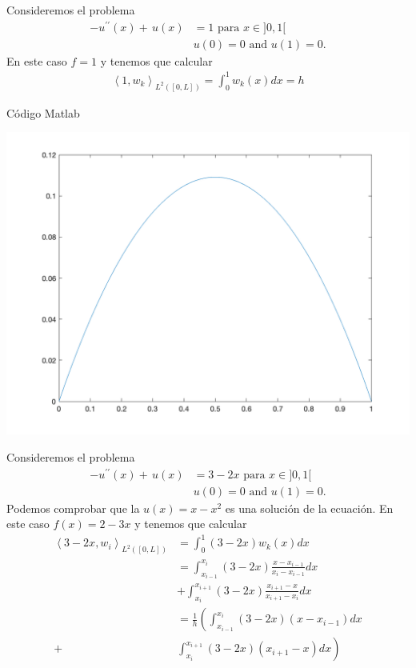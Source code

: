 \documentclass[10pt,handout]{beamer}
\theoremstyle{plain} %
\theoremstyle{plain} %
\theoremstyle{plain} %
\theoremstyle{plain} %
\theoremstyle{definition}
\theoremstyle{example}
\theoremstyle{example}
\theoremstyle{remark}
\theoremstyle{remark}
\begin{document}
\begin{frame}
Consideremos el problema
\begin{align*}
- u^{\prime \prime}(x) + \,u(x) & = 1 \text{ para } x \in ]0,1[\\ 
& u(0) = 0  \text{ and } u(1) = 0.  
\end{align*}
En este caso $f=1$ y tenemos que calcular
\begin{align*}
\left\langle 1, w_{k} \right\rangle_{L^2([0,L])} = \int_0^1 w_k(x) dx = h
\end{align*}
\end{frame}

\begin{frame}{Código Matlab}

\end{frame}

\begin{frame}
\begin{center}
\includegraphics[scale=0.2]{grafica.png}
\end{center}
\end{frame}

\begin{frame}
Consideremos el problema
\begin{align*}
- u^{\prime \prime}(x) + \,u(x) & = 3-2x \text{ para } x \in ]0,1[\\ 
& u(0) = 0  \text{ and } u(1) = 0.  
\end{align*}
Podemos comprobar que la $u(x)=x-x^2$ es una solución de la ecuación. En este 
caso $f(x)=2-3x$ y tenemos que calcular
\begin{align*}
\left\langle 3-2x, w_{i} \right\rangle_{L^2([0,L])} & = \int_0^1 (3-2x) w_k(x) dx \\ 
& =  \int_{x_{i-1}}^{x_i} (3-2x) \frac{x-x_{i-1}}{x_i-x_{i-1}} dx \\ & +
\int_{x_{i}}^{x_{i+1}} (3-2x) \frac{x_{i+1}-x}{x_{i+1}-x_i} dx \\ 
& = \frac{1}{h }\left(\int_{x_{i-1}}^{x_i} (3-2x) (x-x_{i-1}) dx \right. \\ + 
& \left. \int_{x_{i}}^{x_{i+1}} (3-2x) (x_{i+1}-x) dx\right)
\end{align*}
\end{frame}
\end{document}

